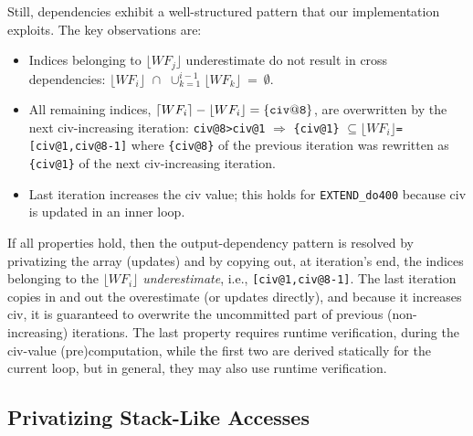 \documentclass[10pt,nocopyrightspace]{sigplanconf}
\begin{document}
Still, dependencies exhibit a well-structured pattern that our 
implementation exploits. The key observations are: 
\begin{itemize}
    \item Indices belonging to $\lfloor{}WF_{j}\rfloor$ underestimate  
            do not result in cross dependencies:
        $\lfloor WF_{i}\rfloor\mbox{~}\cap\mbox{~}\cup_{k=1}^{i-1}\lfloor WF_{k}\rfloor~=~\emptyset$.

    \item All remaining indices, 
        $\lceil WF_{i}\rceil - \lfloor WF_{i}\rfloor = {\tt\{civ@8\}}$,
        are overwritten by the next {\sc civ}-increasing iteration:
        {\tt{}civ@8>civ@1} $\Rightarrow$
        {\tt\{civ@1\}} $\subseteq\lfloor WF_{i}\rfloor${\tt=[civ@1,civ@8-1]}
        where {\tt\{civ@8\}} of the previous iteration was rewritten as 
        {\tt\{civ@1\}} of the next {\sc civ}-increasing iteration.

    \item Last iteration increases the {\sc civ} value; this 
        holds for {\tt EXTEND\_do400} because {\sc civ} is 
        updated in an inner loop.
\end{itemize}

If all properties hold, then the output-dependency pattern is resolved 
by privatizing the array (updates) and by copying out, at 
iteration's end, the indices belonging to the $\lfloor WF_i\rfloor$ 
{\em underestimate}, i.e., {\tt[civ@1,civ@8-1]}.
The last iteration copies in and out the overestimate (or updates directly),
and because it increases {\sc civ}, it is guaranteed to overwrite the 
uncommitted part of previous (non-increasing) iterations.
%
The last property requires runtime verification, during the {\sc civ}-value
(pre)computation, while the first two are derived statically for the current 
loop, but in general, they may also use runtime verification.


\enlargethispage{\baselineskip}

\subsection{Privatizing Stack-Like Accesses} %
\label{sec:Stack}
\end{document}
